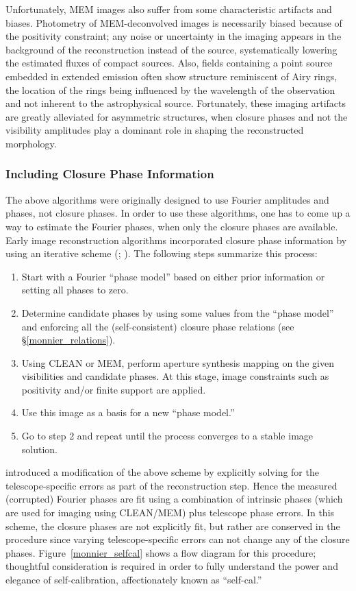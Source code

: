 \documentclass[12pt]{iopart}
\begin{document}
Unfortunately, MEM images also suffer from some characteristic artifacts
and biases.  Photometry of MEM-deconvolved images is necessarily biased
because of the positivity constraint; any noise or uncertainty in the
imaging appears in the background of the reconstruction instead of
the source, systematically lowering the estimated fluxes of compact sources.
Also, fields containing a point source embedded in extended emission
often show structure reminiscent of Airy rings, the location of the
rings being influenced by the wavelength of the observation and not inherent
to the astrophysical source.  Fortunately, these imaging artifacts 
are greatly
alleviated for asymmetric structures, when closure phases and not
the visibility amplitudes play a dominant role in shaping the
reconstructed morphology.



\subsubsection{Including Closure Phase Information}

The above algorithms were originally 
designed to use Fourier amplitudes and
phases, not closure phases.  In order to use these algorithms,
one has to come up a way to estimate the Fourier phases, when only
the closure phases are available.
Early image reconstruction algorithms
incorporated closure phase information by using an iterative scheme
(\citealt{thompson86}; \citealt{rw78}).  
The following steps summarize
this process:
\begin{enumerate}
\item{Start with a Fourier ``phase model'' based on either prior
    information or setting all phases to zero.}
\item{Determine candidate phases by using some values from the ``phase
    model'' and enforcing all the (self-consistent) closure phase
    relations (see \S\ref{monnier_relations}).}
\item{Using CLEAN or MEM, perform aperture synthesis mapping on the
    given visibilities and candidate phases.  At this stage, image
    constraints such as positivity and/or finite support are applied.}
\item{Use this image as a basis for a new ``phase model.''}
\item{Go to step 2 and repeat until the process converges to a stable
    image solution.} \end{enumerate}

\cite{cw81} introduced a modification of the above scheme by
explicitly solving for the telescope-specific errors as part of the
reconstruction step.  Hence the measured (corrupted) Fourier phases
are fit using a combination of intrinsic phases (which are used for
imaging using CLEAN/MEM) plus telescope phase errors.  In this scheme,
the closure phases are not explicitly fit, but rather are conserved in
the procedure since varying telescope-specific errors can not change
any of the closure phases.  Figure~\ref{monnier_selfcal} shows a flow
diagram for this procedure; thoughtful consideration is required in
order to fully understand the power and elegance of self-calibration,
affectionately known as  ``self-cal.''
\end{document}
